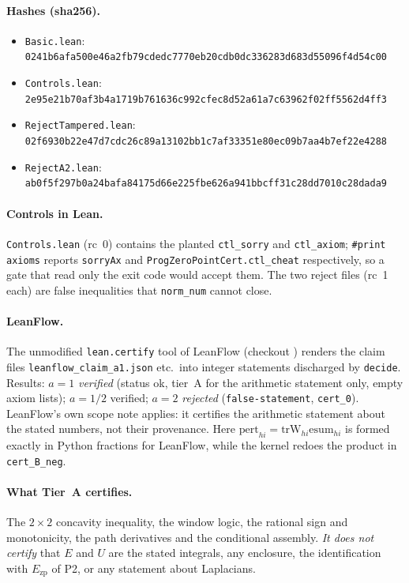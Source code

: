 \documentclass[10pt]{article}
\newcommand{\lean}[1]{\texttt{#1}}
\newcommand{\Ezp}{E_{\mathrm{zp}}}
\begin{document}
\paragraph{Hashes (sha256).}
\begin{itemize}\scriptsize\itemsep=0pt
\item \texttt{Basic.lean}: \texttt{0241b6afa500e46a2fb79cdedc7770eb20cdb0dc336283d683d55096f4d54c00}
\item \texttt{Controls.lean}: \texttt{2e95e21b70af3b4a1719b761636c992cfec8d52a61a7c63962f02ff5562d4ff3}
\item \texttt{RejectTampered.lean}: \texttt{02f6930b22e47d7cdc26c89a13102bb1c7af33351e80ec09b7aa4b7ef22e4288}
\item \texttt{RejectA2.lean}: \texttt{ab0f5f297b0a24bafa84175d66e225fbe626a941bbcff31c28dd7010c28dada9}
\end{itemize}
\paragraph{Controls in Lean.} \lean{Controls.lean} (rc~0) contains the planted \lean{ctl\_sorry} and \lean{ctl\_axiom}; \lean{\#print axioms} reports \lean{sorryAx} and \lean{ProgZeroPointCert.ctl\_cheat} respectively, so a gate that read only the exit code would accept them. The two reject files (rc~1 each) are false inequalities that \lean{norm\_num} cannot close.
\paragraph{LeanFlow.} The unmodified \lean{lean.certify} tool of LeanFlow (checkout ) renders the claim files \texttt{leanflow\_claim\_a1.json} etc.\ into integer statements discharged by \lean{decide}. Results: $a=1$ \emph{verified} (status ok, tier~A for the arithmetic statement only, empty axiom lists); $a=1/2$ verified; $a=2$ \emph{rejected} (\texttt{false-statement}, \lean{cert\_0}). LeanFlow's own scope note applies: it certifies the arithmetic statement about the stated numbers, not their provenance. Here $\mathrm{pert}_{hi}=\mathrm{trW}_{hi}\mathrm{esum}_{hi}$ is formed exactly in Python fractions for LeanFlow, while the kernel redoes the product in \lean{cert\_B\_neg}.
\paragraph{What Tier~A certifies.} The $2\times2$ concavity inequality, the window logic, the rational sign and monotonicity, the path derivatives and the conditional assembly. \emph{It does not certify} that $E$ and $U$ are the stated integrals, any enclosure, the identification with $\Ezp$ of P2, or any statement about Laplacians.
\end{document}
